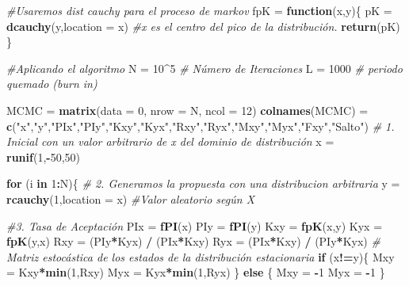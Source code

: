 \documentclass[
]{article}
\newenvironment{Shaded}{\begin{snugshade}}{\end{snugshade}}
\newcommand{\AttributeTok}[1]{\textcolor[rgb]{0.13,0.29,0.53}{#1}}
\newcommand{\CommentTok}[1]{\textcolor[rgb]{0.56,0.35,0.01}{\textit{#1}}}
\newcommand{\ControlFlowTok}[1]{\textcolor[rgb]{0.13,0.29,0.53}{\textbf{#1}}}
\newcommand{\DecValTok}[1]{\textcolor[rgb]{0.00,0.00,0.81}{#1}}
\newcommand{\FunctionTok}[1]{\textcolor[rgb]{0.13,0.29,0.53}{\textbf{#1}}}
\newcommand{\NormalTok}[1]{#1}
\newcommand{\OtherTok}[1]{\textcolor[rgb]{0.56,0.35,0.01}{#1}}
\newcommand{\SpecialCharTok}[1]{\textcolor[rgb]{0.81,0.36,0.00}{\textbf{#1}}}
\newcommand{\StringTok}[1]{\textcolor[rgb]{0.31,0.60,0.02}{#1}}
\begin{document}
\begin{Shaded}
\begin{Highlighting}[]
\CommentTok{\#Usaremos dist cauchy para el proceso de markov}
\NormalTok{fpK }\OtherTok{=} \ControlFlowTok{function}\NormalTok{(x,y)\{}
\NormalTok{  pK }\OtherTok{=} \FunctionTok{dcauchy}\NormalTok{(y,}\AttributeTok{location =}\NormalTok{ x) }\CommentTok{\#x es el centro del pico de la distribución.}
  \FunctionTok{return}\NormalTok{(pK)}
\NormalTok{\}}

\CommentTok{\#Aplicando el algoritmo}
\NormalTok{N }\OtherTok{=} \DecValTok{10}\SpecialCharTok{\^{}}\DecValTok{5} \CommentTok{\# Número de Iteraciones}
\NormalTok{L }\OtherTok{=} \DecValTok{1000} \CommentTok{\# periodo quemado (burn in)}

\NormalTok{MCMC }\OtherTok{=} \FunctionTok{matrix}\NormalTok{(}\AttributeTok{data =} \DecValTok{0}\NormalTok{, }\AttributeTok{nrow =}\NormalTok{ N, }\AttributeTok{ncol =} \DecValTok{12}\NormalTok{)}
\FunctionTok{colnames}\NormalTok{(MCMC) }\OtherTok{=}
  \FunctionTok{c}\NormalTok{(}\StringTok{"x"}\NormalTok{,}\StringTok{"y"}\NormalTok{,}\StringTok{"PIx"}\NormalTok{,}\StringTok{"PIy"}\NormalTok{,}\StringTok{"Kxy"}\NormalTok{,}\StringTok{"Kyx"}\NormalTok{,}\StringTok{"Rxy"}\NormalTok{,}\StringTok{"Ryx"}\NormalTok{,}\StringTok{"Mxy"}\NormalTok{,}\StringTok{"Myx"}\NormalTok{,}\StringTok{"Fxy"}\NormalTok{,}\StringTok{"Salto"}\NormalTok{)}
\CommentTok{\# 1. Inicial con un valor arbitrario de x del dominio de distribución}
\NormalTok{x }\OtherTok{=} \FunctionTok{runif}\NormalTok{(}\DecValTok{1}\NormalTok{,}\SpecialCharTok{{-}}\DecValTok{50}\NormalTok{,}\DecValTok{50}\NormalTok{)}

\ControlFlowTok{for}\NormalTok{ (i }\ControlFlowTok{in} \DecValTok{1}\SpecialCharTok{:}\NormalTok{N)\{}
  \CommentTok{\# 2. Generamos la propuesta con una distribucion arbitraria}
\NormalTok{  y }\OtherTok{=} \FunctionTok{rcauchy}\NormalTok{(}\DecValTok{1}\NormalTok{,}\AttributeTok{location =}\NormalTok{ x) }\CommentTok{\#Valor aleatorio según X}
  
  \CommentTok{\#3. Tasa de Aceptación}
\NormalTok{  PIx }\OtherTok{=} \FunctionTok{fPI}\NormalTok{(x)}
\NormalTok{  PIy }\OtherTok{=} \FunctionTok{fPI}\NormalTok{(y)}
\NormalTok{  Kxy }\OtherTok{=} \FunctionTok{fpK}\NormalTok{(x,y)}
\NormalTok{  Kyx }\OtherTok{=} \FunctionTok{fpK}\NormalTok{(y,x)}
\NormalTok{  Rxy }\OtherTok{=}\NormalTok{ (PIy}\SpecialCharTok{*}\NormalTok{Kyx) }\SpecialCharTok{/}\NormalTok{ (PIx}\SpecialCharTok{*}\NormalTok{Kxy)}
\NormalTok{  Ryx }\OtherTok{=}\NormalTok{ (PIx}\SpecialCharTok{*}\NormalTok{Kxy) }\SpecialCharTok{/}\NormalTok{ (PIy}\SpecialCharTok{*}\NormalTok{Kyx)}
  \CommentTok{\# Matriz estocástica de los estados de la distribución estacionaria}
  \ControlFlowTok{if}\NormalTok{ (x}\SpecialCharTok{!=}\NormalTok{y)\{}
\NormalTok{    Mxy }\OtherTok{=}\NormalTok{ Kxy}\SpecialCharTok{*}\FunctionTok{min}\NormalTok{(}\DecValTok{1}\NormalTok{,Rxy)}
\NormalTok{    Myx }\OtherTok{=}\NormalTok{ Kyx}\SpecialCharTok{*}\FunctionTok{min}\NormalTok{(}\DecValTok{1}\NormalTok{,Ryx)}
\NormalTok{  \}}
  \ControlFlowTok{else}
\NormalTok{  \{ Mxy }\OtherTok{=} \SpecialCharTok{{-}}\DecValTok{1}
\NormalTok{  Myx }\OtherTok{=} \SpecialCharTok{{-}}\DecValTok{1}
\NormalTok{  \}}
  

\end{Highlighting}
\end{Shaded}
\end{document}
